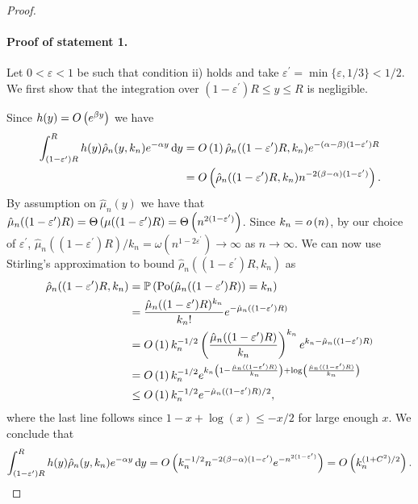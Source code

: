 \begin{proof} \hfill

\paragraph{Proof of statement 1.}
Let $0 < \varepsilon < 1$ be such that condition ii) holds and take $\varepsilon^\prime = \min\{\varepsilon,1/3\} < 1/2$. We first show that the integration over $(1-\varepsilon^\prime)R \le y \le R$ is negligible.
 
Since $h(y) = O\left(e^{\beta y}\right)$ we have
\begin{align*}
	\int_{(1-\varepsilon^\prime)R}^{R} h(y) \hat{\rho}_n(y,k_n) e^{-\alpha y} \operatorname{\mathrm{d}\hspace{-2pt}} y
	&= O\left(1\right) \hat{\rho}_n((1-\varepsilon^\prime)R,k_n) e^{-(\alpha-\beta)(1-\varepsilon^\prime)R} \\
	&= O\left(\hat{\rho}_n((1-\varepsilon^\prime)R,k_n) n^{-2(\beta-\alpha)(1-\varepsilon^\prime)}\right).
\end{align*}
By assumption on $\hat{\mu}_n(y)$ we have that $\hat{\mu}_n((1-\varepsilon^\prime)R) = \Theta\left(\mu((1-\varepsilon^\prime)R\right) = \Theta\left(n^{2(1-\varepsilon^\prime)}\right)$. Since $k_n = o\left(n\right)$, by our choice of $\varepsilon^\prime$, $\hat{\mu}_n((1-\varepsilon^\prime)R)/k_n = \omega\left(n^{1 - 2\varepsilon^\prime}\right) \to \infty$ as $n \to \infty$. We can now use Stirling's approximation to bound $\hat{\rho}_n((1-\varepsilon^\prime)R,k_n)$ as
\begin{align*}
	\hat{\rho}_n((1-\varepsilon^\prime)R,k_n) &= \mathbb{P}\left({\mathrm{Po}}(\hat{\mu}_n((1-\varepsilon^\prime)R)) = k_n\right) \\
	&= \frac{\hat{\mu}_n((1-\varepsilon^\prime)R)^{k_n}}{k_n!} e^{-\hat{\mu}_n((1-\varepsilon^\prime)R)}\\
	&= O\left(1\right) k_n^{-1/2} \left(\frac{\hat{\mu}_n((1-\varepsilon^\prime)R)}{k_n}\right)^{k_n} e^{k_n - \hat{\mu}_n((1-\varepsilon^\prime)R)}\\
	&= O\left(1\right) k_n^{-1/2} e^{k_n\left(1 - \frac{\hat{\mu}_n((1-\varepsilon^\prime)R)}{k_n}\right)+ \log\left(\frac{\hat{\mu}_n((1-\varepsilon^\prime)R)}{k_n}\right)}\\
	&\le O\left(1\right) k_n^{-1/2} e^{-\hat{\mu}_n((1-\varepsilon^\prime)R)/2},
\end{align*}
where the last line follows since $1 - x + \log(x) \le -x/2$ for large enough $x$. We conclude that
\[
	\int_{(1-\varepsilon^\prime)R}^{R} h(y) \hat{\rho}_n(y,k_n) e^{-\alpha y} \operatorname{\mathrm{d}\hspace{-2pt}} y
	= O\left(k_n^{-1/2} n^{-2(\beta-\alpha)(1-\varepsilon^\prime)} e^{-n^{2(1-\varepsilon^\prime)}}\right)
	= O\left(k_n^{(1+C^2)/2}\right).
\]


\end{proof}
